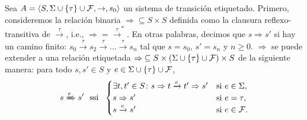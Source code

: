 Sea $A =\langle S, \Sigma \cup \{\tau\} \cup \mathcal{F},  \rightarrow, s_0\rangle$ un sistema de transición etiquetado. Primero, consideremos la relación binaria ${\Rightarrow} \subseteq S \times S$ definida como la clausura reflexo-transitiva de $\xrightarrow{\tau}$, i.e., ${\Rightarrow} = {\xrightarrow{\tau}^*}$.  En otras palabras, decimos que $s \Rightarrow s'$ si hay un camino finito:  $s_0 \xrightarrow{\tau} s_2 \xrightarrow{\tau} \dots \xrightarrow{\tau} s_n$ tal que $s = s_0$, $s' = s_n$ y $n \geq 0$.
$\Rightarrow$ se puede extender a una relación etiquetada ${\Rightarrow} \subseteq S\times (\Sigma \cup \{\tau\} \cup \mathcal{F}) \times S$ de la siguiente manera: para todo $s,s'\in S$ y $e\in {\Sigma \cup \{\tau\} \cup \mathcal{F}}$,
 \[
s \xRightarrow{e} s' \text{ \ ssi \ }
        \begin{cases}
            \exists t,t'\in S \colon s \Rightarrow t \xrightarrow{e} t' \Rightarrow s' & 
             \text{si } e \in \Sigma,  \\ 
            s \Rightarrow s' & \text{si } e = \tau,  \\
            s \xrightarrow{e} s' & \text{si } e \in \mathcal{F}.\\
        \end{cases}
 \]
 


%

